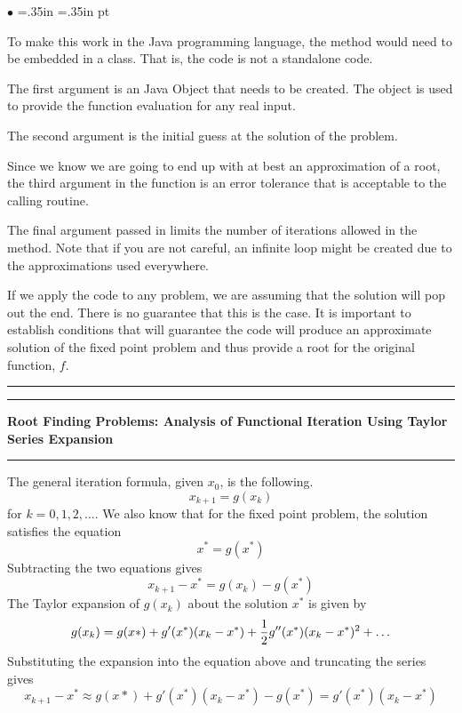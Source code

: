 \documentclass[10pt,fleqn]{article}
\begin{document}
\begin{list}{$\bullet$}{ \parsep=0pt \listparindent=0pt
\topsep=0pt \rightmargin=.35in \leftmargin=.35in  pt
\itemsep=2pt}
  \item To make this work in the Java programming language, the method would
        need to be embedded in a class. That is, the code is not a standalone
        code.
  \item The first argument is an Java Object that needs to be created. The
        object is used to provide the function evaluation for any real input.
  \item The second argument is the initial guess at the solution of the problem.
  \item Since we know we are going to end up with at best an approximation of
        a root, the third argument in the function is an error tolerance that is
        acceptable to the calling routine.
  \item The final argument passed in limits the number of iterations allowed in
        the method. Note that if you are not careful, an infinite loop might be
        created due to the approximations used everywhere.
\end{list}
If we apply the code to any problem, we are assuming that the solution will pop
out the end. There is no guarantee that this is the case. It is important to
establish conditions that will guarantee the code will produce an approximate
solution of the fixed point problem and thus provide a root for the original
function, $f$.
\vskip0.1in\hrule\vskip0.1in
\newpage
\vskip0.1in\hrule\vskip0.1in
\noindent
{\bf Root Finding Problems: Analysis of Functional Iteration Using Taylor
 Series Expansion} 
\vskip0.1in\hrule\vskip0.1in
\noindent
The general iteration formula, given $x_0$, is the following.
$$
  x_{k+1} = g(x_k)
$$
for $k=0,1,2,\ldots$. We also know that for the fixed point problem, the
solution satisfies the equation
$$
  x^* = g(x^*)
$$
Subtracting the two equations gives
$$
  x_{k+1} - x^* = g(x_k) - g(x^*)
$$
The Taylor expansion of $g(x_k)$ about the solution $x^*$ is given by
$$
  g(x_k) = g(x*) + g'(x^*) ( x_k - x^* ) + {1\over 2} g''(x^*) ( x_k - x^* )^2
              + \ldots
$$
Substituting the expansion into the equation above and truncating the series
gives
$$
  x_{k+1} - x^* \approx g(x*) + g'(x^*) ( x_k - x^* ) - g(x^*)
                       = g'(x^*) ( x_k - x^* )
$$
\end{document}
